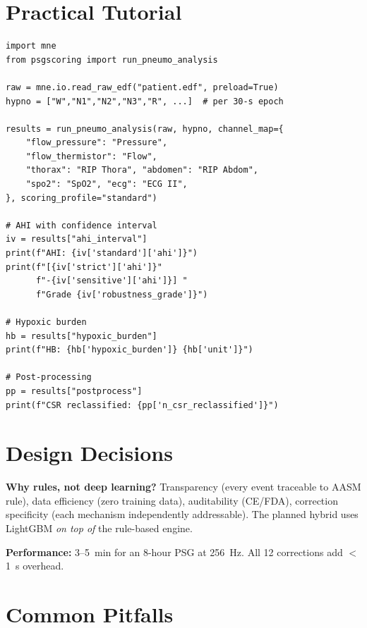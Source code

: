 \documentclass[11pt,a4paper]{article}
\begin{document}
\section{Practical Tutorial}

\begin{lstlisting}
import mne
from psgscoring import run_pneumo_analysis

raw = mne.io.read_raw_edf("patient.edf", preload=True)
hypno = ["W","N1","N2","N3","R", ...]  # per 30-s epoch

results = run_pneumo_analysis(raw, hypno, channel_map={
    "flow_pressure": "Pressure",
    "flow_thermistor": "Flow",
    "thorax": "RIP Thora", "abdomen": "RIP Abdom",
    "spo2": "SpO2", "ecg": "ECG II",
}, scoring_profile="standard")

# AHI with confidence interval
iv = results["ahi_interval"]
print(f"AHI: {iv['standard']['ahi']}")
print(f"[{iv['strict']['ahi']}"
      f"-{iv['sensitive']['ahi']}] "
      f"Grade {iv['robustness_grade']}")

# Hypoxic burden
hb = results["hypoxic_burden"]
print(f"HB: {hb['hypoxic_burden']} {hb['unit']}")

# Post-processing
pp = results["postprocess"]
print(f"CSR reclassified: {pp['n_csr_reclassified']}")
\end{lstlisting}

\section{Design Decisions}

\textbf{Why rules, not deep learning?} Transparency (every event
traceable to AASM rule), data efficiency (zero training data),
auditability (CE/FDA), correction specificity (each mechanism
independently addressable). The planned hybrid uses LightGBM
\emph{on top of} the rule-based engine.

\textbf{Performance:} 3--5~min for an 8-hour PSG at 256~Hz.
All 12 corrections add $<$1~s overhead.

\section{Common Pitfalls}
\end{document}
